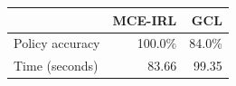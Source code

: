 \begin{tabular}{lrr}
\toprule
 & MCE-IRL & GCL \\
\midrule
Policy accuracy & 100.0\% & 84.0\% \\
Time (seconds) & 83.66 & 99.35 \\
\bottomrule
\end{tabular}

